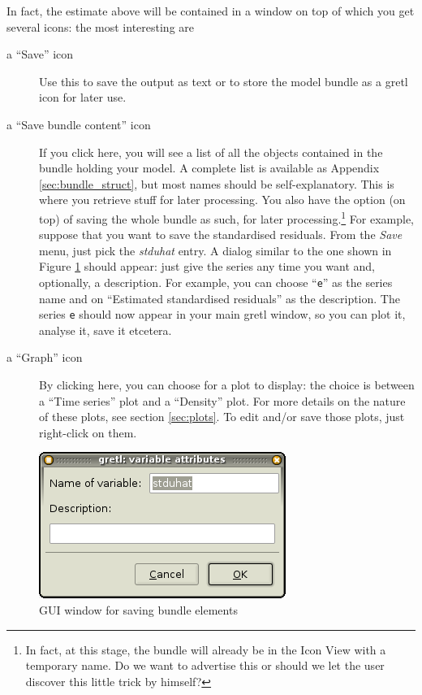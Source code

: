 \documentclass[a4paper,11pt]{article}
\newcommand{\app}[1]{\textsf{#1}}
\newcounter{script}[section]
\begin{document}
In fact, the estimate above will be contained in a window on top of
which you get several icons: the most interesting are
\begin{description}
\item[a ``Save'' icon] Use this to save the output as text or to store
  the model bundle as a gretl icon for later use.
\item[a ``Save bundle content'' icon] If you click here, you will see
  a list of all the objects contained in the bundle holding your
  model. A complete list is available as Appendix
  \ref{sec:bundle_struct}, but most names should be
  self-explanatory. This is where you retrieve stuff for later
  processing. You also have the option (on top) of saving the whole
  bundle as such, for later processing.\footnote{In fact, at this
    stage, the bundle will already be in the Icon View with a
    temporary name. Do we want to advertise this or should we let the
    user discover this little trick by himself?} For example, suppose
  that you want to save the standardised residuals. From the
  \emph{Save} menu, just pick the \emph{stduhat} entry. A dialog
  similar to the one shown in Figure \ref{fig:GUI-saveres} should
  appear: just give the series any time you want and, optionally, a
  description. For example, you can choose ``\texttt{e}'' as the
  series name and on ``Estimated standardised residuals'' as the
  description. The series \texttt{e} should now appear in your main
  \app{gretl} window, so you can plot it, analyse it, save it
  etcetera.

\item[a ``Graph'' icon] By clicking here, you can choose for a plot to
  display: the choice is between a ``Time series'' plot and a
  ``Density'' plot. For more details on the nature of these plots, see
  section \ref{sec:plots}. To edit and/or save those plots, just
  right-click on them.
\end{description}

\begin{figure}[htb]
  \centering
  \includegraphics[scale=0.5]{graphs/GUI-saveres}
  \caption{GUI window for saving bundle elements}
  \label{fig:GUI-saveres}
\end{figure}
\end{document}
